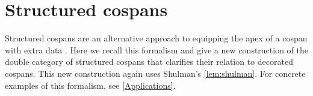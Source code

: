 \documentclass[ a4paper, onecolumn, superscriptaddress,10pt, accepted=2022-02-14, issue=3, volume=4, shorttitle=papers/compositionality-4-3 ]{compositionalityarticle}
\newcommand{\A}{\mathsf{A}}
\newcommand{\inta}{\raisebox{.3\depth}{$\smallint\hspace{-.01in}$}}
\begin{document}
\iffalse
we have a natural isomorphism between $0_{\inta F'}$ and $G(0_{\inta F})$ given by:
\[
\begin{tikzpicture}[scale=1.5]
\node (A) at (-1,0.5) {$\scriptscriptstyle{1}$};
\node () at (4,0.66) {$\scriptscriptstyle{\cong}$};
\node (A1) at (0,0) {$\scriptscriptstyle{E(1)}$};
\node (A2) at (2,0) {$\scriptscriptstyle{E(F(0_\A))}$};
\node (A3) at (4,0) {$\scriptscriptstyle{E(F(0_\A))}$};
\node (A4) at (6,0) {$\scriptscriptstyle{F'(H(0_\A))}$};
\node (A') at (2,0.5) {$\scriptscriptstyle{F'(H(0_\A))}$};
\node (B1) at (0,1) {$\scriptscriptstyle{F'(0_{\A'})}$};
\node (B2) at (6,1) {$\scriptscriptstyle{F'(0_{\A'})}$};
\path[->,font=\scriptsize,>=angle 90]
(A) edge node [below] {$\scriptscriptstyle{E_0}$} (A1)
(A) edge node [above] {$\scriptscriptstyle{\phi_0'}$} (B1)
(A1) edge node [above] {$\scriptscriptstyle{E(\phi_0)}$} (A2)
(A2) edge node [below] {$\scriptscriptstyle{E(F(!_{0_\A}))}$} (A3)
(A3) edge node [below] {$\scriptscriptstyle{\theta_{0_\A}}$} (A4)
(A2) edge node [left] {$\scriptscriptstyle{\theta_{0_\A}}$} (A')
(B1) edge node [fill=white] {$\scriptscriptstyle{F'(H_0)}$} (A')
(A') edge node [fill=white] {$\scriptscriptstyle{F'(H(!_{0_\A}))}$} (A4)
(B2) edge node [right] {$\scriptscriptstyle{F'(H_0)}$} (A4)
(B1) edge node [above] {$\scriptscriptstyle{F'(!_{0_{\A'}})}$} (B2);
\end{tikzpicture}
\]
\fi

\section{Structured cospans} \label{Structured}

Structured cospans are an alternative approach to equipping the apex of a cospan with
extra data \cite{BC}.    Here we recall this formalism and give a new construction of the double category of structured cospans that clarifies their
relation to decorated cospans.   This new construction again uses Shulman's \cref{lem:shulman}. For concrete examples of this formalism, see
\cref{Applications}.
\end{document}
